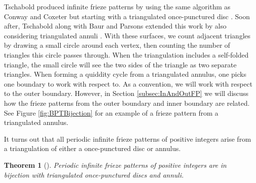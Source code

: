 \documentclass[12pt]{article}
\newtheorem{theorem}{Theorem}
\theoremstyle{remark}
\begin{document}
Tschabold produced infinite frieze patterns by using the same algorithm as Conway and Coxeter but starting with a triangulated once-punctured disc \cite{20}. Soon after, Tschabold along with Baur and Parsons extended this work by also considering triangulated annuli \cite{1}. With these surfaces, we count adjacent triangles by drawing a small circle around each vertex, then counting the number of triangles this circle passes through. When the triangulation includes a self-folded triangle, the small circle will see the two sides of the triangle as two separate triangles.  When forming a quiddity cycle from a triangulated annulus, one picks one boundary to work with respect to. As a convention, we will work with respect to the outer boundary. However, in Section \ref{subsec:InAndOutFP} we will discuss how the frieze patterns from the outer boundary and inner boundary are related. See Figure \ref{fig:BPTBijection} for an example of a frieze pattern from a triangulated annulus.

It turns out that all periodic infinite frieze patterns of positive integers arise from a triangulation of either a once-punctured disc or annulus. 

\begin{theorem}[\cite{1}]
Periodic infinite frieze patterns of positive integers are in bijection with triangulated once-punctured discs and annuli. 
\end{theorem}
\end{document}
